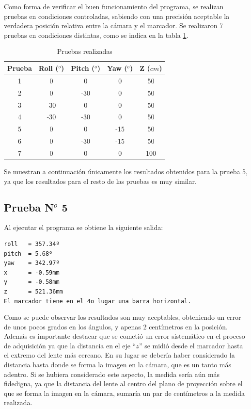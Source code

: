 Como forma de verificar el buen funcionamiento del programa, se realizan pruebas en condiciones controladas, sabiendo con una precisión aceptable la verdadera posición relativa entre la cámara y el marcador. Se realizaron 7 pruebas en condiciones distintas, como se indica en la tabla \ref{tab:pruebas}.
\begin{table}[H]
\centering
\begin{tabular}{|c|c|c|c|c|} 
\hline \cellcolor[gray]{0.8} \textbf{Prueba} & \cellcolor[gray]{0.8} \textbf{Roll ($^o$)} & \cellcolor[gray]{0.8} \textbf{Pitch ($^o$)} & \cellcolor[gray]{0.8} \textbf{Yaw ($^o$)} & \cellcolor[gray]{0.8} \textbf{Z ($cm$)}\\ 
\hline 1 & 0   & 0   & 0   & 50 \\ 
\hline 2 & 0   & -30 & 0   & 50 \\ 
\hline 3 & -30 & 0   & 0   & 50 \\ 
\hline 4 & -30 & -30 & 0   & 50 \\ 
\hline 5 & 0   & 0   & -15 & 50 \\ 
\hline 6 & 0   & -30 & -15 & 50 \\ 
\hline 7 & 0   & 0   & 0   & 100 \\
\hline
\end{tabular} 
\caption{Pruebas realizadas}
\label{tab:pruebas}
\end{table}

Se muestran a continuación únicamente los resultados obtenidos para la prueba 5, ya que los resultados para el resto de las pruebas es muy similar.

\subsection{Prueba N$^o$ 5}

Al ejecutar el programa se obtiene la siguiente salida:

\begin{verbatim}
roll   = 357.34º
pitch  = 5.68º
yaw    = 342.97º
x      = -0.59mm
y      = -0.58mm
z      = 521.36mm
El marcador tiene en el 4o lugar una barra horizontal.
\end{verbatim}

Como se puede observar los resultados son muy aceptables, obteniendo un error de unos pocos grados en los ángulos, y apenas 2 centímetros en la posición. Además es importante destacar que se cometió un error sistemático en el proceso de adquisición ya que la distancia en el eje ``$z$'' se midió desde el marcador hasta el extremo del lente más cercano. En su lugar se debería haber considerado la distancia hasta donde se forma la imagen en la cámara, que es un tanto más adentro. Si se hubiera considerado este aspecto, la medida sería aún más fidedigna, ya que la distancia del lente al centro del plano de proyección sobre el que se forma la imagen en la cámara, sumaría un par de centímetros a la medida realizada.

